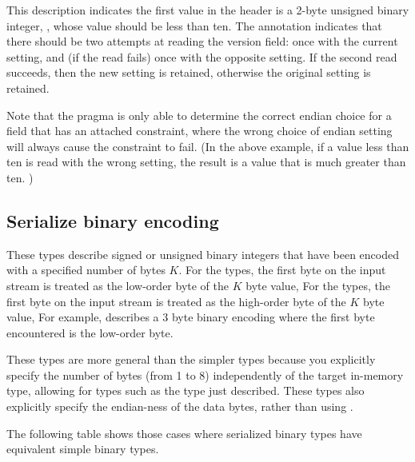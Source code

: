 %
\noindent
This \padsl{} description indicates the first value in the header
is a 2-byte unsigned binary integer, ,
whose value should be less than ten.   The  annotation indicates that there
should be two attempts at reading the version field: once with the
current  setting, and (if the read fails) once with the
opposite  setting.  If the second read succeeds, then
the new  setting is retained, otherwise the original
setting is retained.

Note that the  pragma is only able to determine the correct endian
choice for a field that has an attached constraint, where the
wrong choice of endian setting will always cause the constraint to fail.
(In the above example, if a value less than ten is read with the wrong 
setting, the result is a value that is much greater than ten. )

\subsection{Serialize binary encoding}

\sbBegin{}
\bEnd{}

These types describe signed or unsigned binary integers
that have been encoded with a specified number of bytes $K$.
For the  types, the first byte on the input
stream is treated as the low-order byte of the $K$ byte value,
For the  types, the first byte on the input
stream is treated as the high-order byte of the $K$ byte value,
For example,  describes a 3 byte
binary encoding where the first byte encountered is the
low-order byte.

These types are more general than the simpler  types because
you explicitly specify the number of bytes (from 1 to 8) independently
of the target in-memory type, allowing for types such as the
 type just described.  These types
also explicitly specify the endian-ness of the data bytes,
rather than using .

The following table shows those cases where serialized
binary types have equivalent simple binary types.

